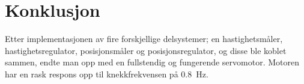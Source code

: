 \section{Konklusjon}\label{sec:konklusjon}

Etter implementasjonen av fire forskjellige delsystemer; en hastighetsmåler, hastighetsregulator, posisjonsmåler og posisjonsregulator, og disse ble koblet sammen, endte man opp med en fullstendig og fungerende servomotor. 
Motoren har en rask respons opp til knekkfrekvensen på {\SI{0.8}{\hertz}}.

